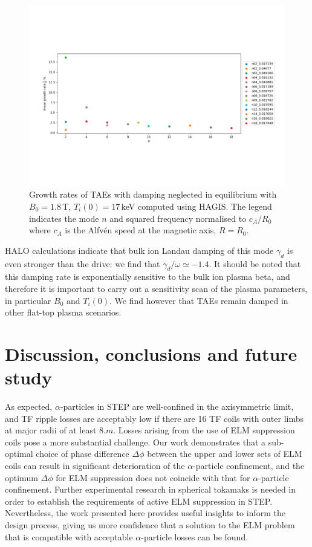\documentclass[10pt, a4paper, twoside]{article}
\begin{document}
\begin{figure}[!htb]
    \centering
    \vskip -3.0cm
    \includegraphics[width=1.0\linewidth]{Figures/TAE_figure.pdf}
    \vskip -3.0cm
    \caption{Growth rates of TAEs with damping neglected in equilibrium with $B_0 = 1.8\,$T, $T_i(0) = 17\,$keV computed using HAGIS. The legend indicates the mode $n$ and squared frequency normalised to $c_A/R_0$ where $c_A$ is the Alfv\'en speed at the magnetic axis, $R=R_0$.}
    \label{fig:TAEs}
\end{figure}

HALO calculations indicate that bulk ion Landau damping of this mode $\gamma_d$ is even stronger than the drive: we find that $\gamma_d/\omega \simeq -1.4$. It should be noted that this damping rate is exponentially sensitive to the bulk ion plasma beta, and therefore it is important to carry out a sensitivity scan of the plasma parameters, in particular $B_0$ and $T_i(0)$. We find however that TAEs remain damped in other flat-top plasma scenarios.        

\section{Discussion, conclusions and future study}
\label{sec:discussion_and_conclusions}

As expected, $\alpha$-particles in STEP are well-confined in the axisymmetric limit, and TF ripple losses are acceptably low if there are 16 TF coils with outer limbs at major radii of at least $\si{8.m}$. Losses arising from the use of ELM suppression coils pose a more substantial challenge. Our work demonstrates that a sub-optimal choice of phase difference $\Delta\phi$ between the upper and lower sets of ELM coils can result in significant deterioration of the $\alpha$-particle confinement, and the optimum $\Delta\phi$ for ELM suppression does not coincide with that for $\alpha$-particle confinement. Further experimental research in spherical tokamaks is needed in order to establish the requirements of active ELM suppression in STEP. Nevertheless, the work presented here provides useful insights to inform the design process, giving us more confidence that a solution to the ELM problem that is compatible with acceptable $\alpha$-particle losses can be found.
\end{document}
